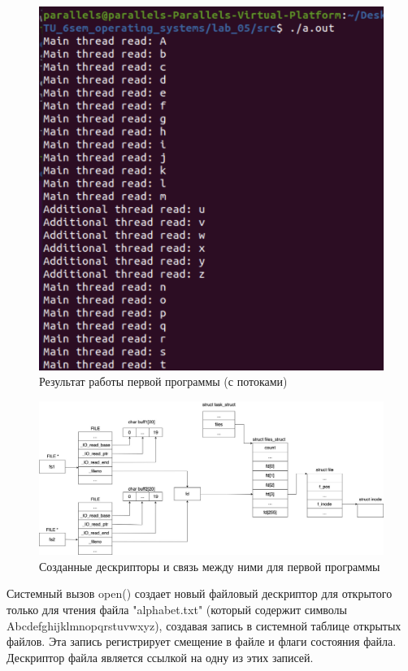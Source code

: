 \documentclass[12pt]{report}
\begin{document}
\begin{figure}[H]
	\centering
	\includegraphics[scale=0.6]{img/prog_01_thread.png}
	\caption{Результат работы первой программы (с потоками)}
	\label{fig:prog_01_thread}
\end{figure}



\begin{figure}[H]
	\centering
	\includegraphics[scale=0.33]{img/prog_01_schema.jpg}
	\caption{Созданные дескрипторы и связь между ними для первой программы}
	\label{fig:prog_01_schema}
\end{figure}

Системный вызов open() создает новый файловый дескриптор для открытого только для чтения файла "alphabet.txt" (который содержит символы Abcdefghijklmnopqrstuvwxyz), создавая запись в системной таблице открытых файлов. Эта запись регистрирует смещение в файле и флаги состояния файла. Дескриптор файла является ссылкой на одну из этих записей. 
\end{document}
